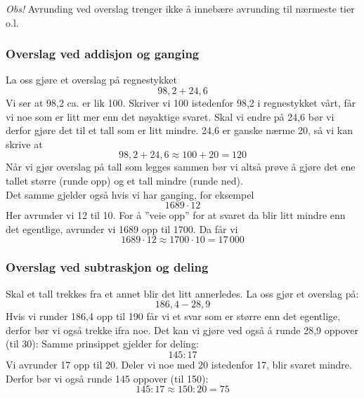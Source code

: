 \textit{Obs!} Avrunding ved overslag trenger ikke å innebære avrunding til nærmeste tier o.l.\vsk


\subsubsection{Overslag ved addisjon og ganging}
La oss gjøre et overslag på regnestykket
\[ 98,2+24,6 \]
Vi ser at 98,2 ca. er lik 100. Skriver vi 100 istedenfor 98,2 i regnestykket vårt, får vi noe som er litt mer enn det nøyaktige svaret. Skal vi endre på 24,6 bør vi derfor gjøre det til et tall som er litt mindre. 24,6 er ganske nærme 20, så vi kan skrive at
\[ 98,2+24,6 \approx 100 + 20 = 120 \]
Når vi gjør overslag på tall som legges sammen bør vi altså prøve å gjøre det ene tallet større (runde opp) og et tall mindre (runde ned).\\

\linje
Det samme gjelder også hvis vi har ganging, for eksempel
\[ 1689\cdot12 \]
Her avrunder vi 12 til 10. For å ''veie opp'' for at svaret da blir litt mindre enn det egentlige, avrunder vi 1689 opp til 1700. Da får vi
\[ 1689\cdot12\approx 1700\cdot 10 =17\,000 \]
\subsubsection{Overslag ved subtraskjon og deling}
Skal et tall trekkes fra et annet blir det litt annerledes. La oss gjør et overslag på:
\[ 186,4-28,9 \]
Hvis vi runder 186,4 opp til 190 får vi et svar som er større enn det egentlige, derfor bør vi også trekke ifra noe. Det kan vi gjøre ved også å runde 28,9 oppover (til 30):
Samme prinsippet gjelder for deling: 
\[ 145:17 \]
Vi avrunder 17 opp til 20. Deler vi noe med 20 istedenfor 17, blir svaret mindre. Derfor bør vi også runde 145 oppover (til 150):
\[ 145:17 \approx 150:20 = 75 \]

